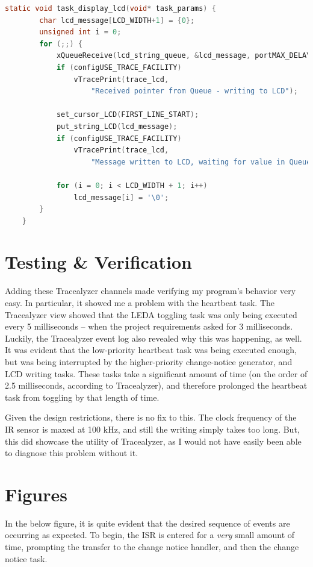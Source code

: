 \documentclass[a4paper, 12pt]{article}
\begin{document}
	\begin{mdframed}[backgroundcolor=code-gray, roundcorner=10pt,
								innerleftmargin=5, innertopmargin=5, innerbottommargin=5]	
	\begin{lstlisting}[language=C, caption=LCD Task, tabsize=2, label={lst:task-display-lcd}]
	static void task_display_lcd(void* task_params) {
		char lcd_message[LCD_WIDTH+1] = {0};
		unsigned int i = 0;
		for (;;) {
			xQueueReceive(lcd_string_queue, &lcd_message, portMAX_DELAY);
			if (configUSE_TRACE_FACILITY)
				vTracePrint(trace_lcd,
					"Received pointer from Queue - writing to LCD");
		
			set_cursor_LCD(FIRST_LINE_START);
			put_string_LCD(lcd_message);
			if (configUSE_TRACE_FACILITY)
				vTracePrint(trace_lcd,
					"Message written to LCD, waiting for value in Queue");
		
			for (i = 0; i < LCD_WIDTH + 1; i++)
				lcd_message[i] = '\0';
		}
	}
	\end{lstlisting}
	\end{mdframed}
	
\section{Testing \& Verification}
Adding these Tracealyzer channels made verifying my program's behavior very easy. In particular, it showed me a problem with the heartbeat task. The Tracealyzer view showed that the LEDA toggling task was only being executed every 5 milliseconds -- when the project requirements asked for 3 milliseconds. Luckily, the Tracealyzer event log also revealed why this was happening, as well. It was evident that the low-priority heartbeat task was being executed enough, but was being interrupted by the higher-priority change-notice generator, and LCD writing tasks. These tasks take a significant amount of time (on the order of 2.5 milliseconds, according to Tracealyzer), and therefore prolonged the heartbeat task from toggling by that length of time.

Given the design restrictions, there is no fix to this. The clock frequency of the IR sensor is maxed at 100 kHz, and still the writing simply takes too long. But, this did showcase the utility of Tracealyzer, as I would not have easily been able to diagnose this problem without it.

\section{Figures}
In the below figure, it is quite evident that the desired sequence of events are occurring as expected. To begin, the ISR is entered for a \emph{very} small amount of time, prompting the transfer to the change notice handler, and then the change notice task.
\end{document}
